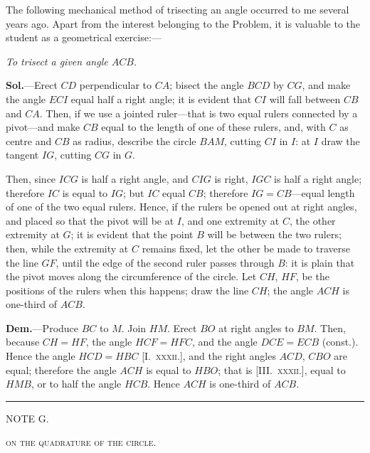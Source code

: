 \documentclass[oneside]{book}
\newcommand{\ibksp}{\hspace{-1.5em}}
\newcommand\imgcent[2]{
\begin{center}
\end{center}
}
\begin{document}
\begin{footnotesize}
The following mechanical method of trisecting an angle occurred
to me several years ago. Apart from the interest belonging
to the Problem, it is valuable to the student as a geometrical
exercise:---

\smallskip
\emph{To trisect a given angle $ACB$.}

\smallskip
\imgcent{204}{f254}

\textbf{Sol.}---Erect $CD$ perpendicular to $CA$; bisect the angle $BCD$
by $CG$, and make the angle $ECI$ equal half a right angle; it is
evident that $CI$ will fall between $CB$ and $CA$. Then, if we use a
jointed ruler---that is two equal rulers connected by a pivot---and
make $CB$ equal to the length of one of these rulers, and, with $C$
as centre and $CB$ as radius, describe the circle $BAM$, cutting
$CI$ in $I$: at $I$ draw the tangent $IG$, cutting $CG$ in $G$.

Then, since $ICG$ is half a right angle, and $CIG$ is right, $IGC$ is
half a right angle; therefore $IC$ is equal to $IG$; but $IC$ equal $CB$;
therefore $IG = CB$---equal length of one of the two equal rulers.
Hence, if the rulers be opened out at right angles, and placed
so that the pivot will be at $I$, and one extremity at $C$, the other
extremity at $G$; it is evident that the point $B$ will be between
the two rulers; then, while the extremity at $C$ remains fixed, let
the other be made to traverse the line $GF$, until the edge of the
second ruler passes through $B$: it is plain that the pivot moves
along the circumference of the circle. Let $CH$, $HF$, be the positions
of the rulers when this happens; draw the line $CH$; the
angle $ACH$ is one-third of $ACB$.

\textbf{Dem.}---Produce $BC$ to $M$. Join $HM$. Erect $BO$ at right
angles to $BM$. Then, because $CH=HF$, the angle $HCF = HFC$,
and the angle $DCE = ECB$ (const.). Hence the angle $HCD
= HBC$ [I.~\textsc{xxxii.}], and the right angles $ACD$, $CBO$ are equal;
therefore the angle $ACH$ is equal to $HBO$; that is [III\@.~\textsc{xxxii.}],
equal to $HMB$, or to half the angle $HCB$. Hence $ACH$ is one-third
of $ACB$.
\end{footnotesize}


\bigskip
\begin{center}
\rule[.5ex]{3cm}{1pt}

\bigskip
\addcontentsline{toc}{section}{\ibksp G.---On the quadrature of the circle,}
{\large NOTE G.}
\medskip

\textsc{on the quadrature of the circle.}
\end{center}
\end{document}
